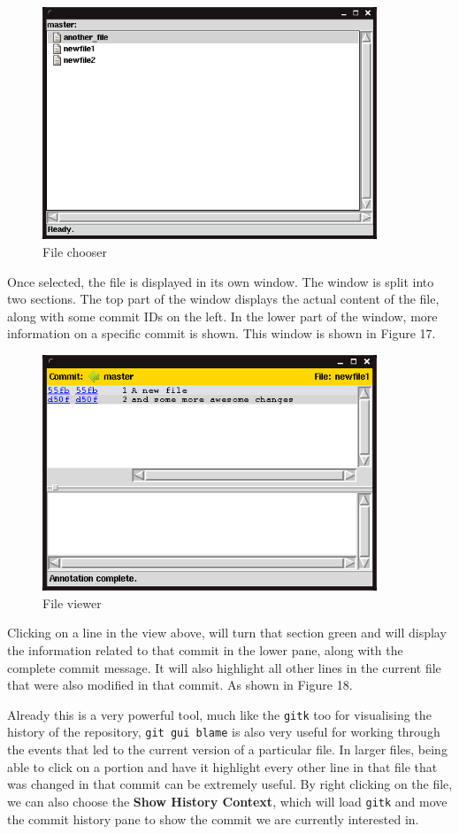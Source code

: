 \begin{figure}[hbt]
\centering
\includegraphics[width=10cm]{images/f-w5-d16.png}
\caption{File chooser}
\end{figure}

Once selected, the file is displayed in its own window.
The window is split into two sections.
The top part of the window displays the actual content of the file, along with some commit IDs on the left.
In the lower part of the window, more information on a specific commit is shown.
This window is shown in Figure 17.

\begin{figure}[hbt]
\centering
\includegraphics[width=10cm]{images/f-w5-d17.png}
\caption{File viewer}
\end{figure}

Clicking on a line in the view above, will turn that section green and will display the information related to that commit in the lower pane, along with the complete commit message.
It will also highlight all other lines in the current file that were also modified in that commit.
As shown in Figure 18.

Already this is a very powerful tool, much like the \texttt{gitk} too for visualising the history of the repository, \texttt{git gui blame} is also very useful for working through the events that led to the current version of a particular file.
In larger files, being able to click on a portion and have it highlight every other line in that file that was changed in that commit can be extremely useful.
By right clicking on the file, we can also choose the \textbf{Show History Context}, which will load \texttt{gitk} and move the commit history pane to show the commit we are currently interested in.

